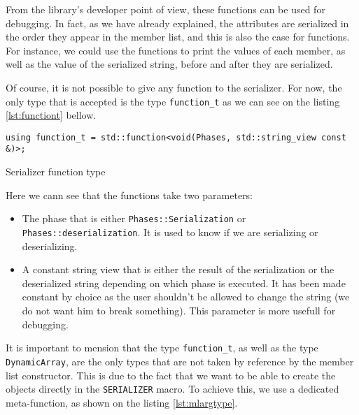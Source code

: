 From the library's developer point of view, these functions can be used for
debugging. In fact, as we have already explained, the attributes are serialized
in the order they appear in the member list, and this is also the case for
functions. For instance, we could use the functions to print the values of each
member, as well as the value of the serialized string, before and after they are
serialized.

Of course, it is not possible to give any function to the serializer. For now,
the only type that is accepted is the type \texttt{function\_t} as we can see on
the listing \ref{lst:functiont} bellow.

\begin{listing}[ht!]
\begin{verbatim}
using function_t = std::function<void(Phases, std::string_view const &)>;
\end{verbatim}
\caption{Serializer function type}
\label{lst:functiont}
\end{listing}

Here we cann see that the functions take two parameters:

\begin{itemize}
  \item The phase that is either \texttt{Phases::Serialization} or
    \texttt{Phases::deserialization}. It is used to know if we are serializing
    or deserializing.
  \item A constant string view that is either the result of the serialization or
    the deserialized string depending on which phase is executed. It has been
    made constant by choice as the user shouldn't be allowed to change the
    string (we do not want him to break something). This parameter is more
    usefull for debugging.
\end{itemize}

It is important to mension that the type \texttt{function\_t}, as well as the
type \texttt{DynamicArray}, are the only types that are not taken by reference
by the member list constructor. This is due to the fact that we want to be able
to create the objects directly in the \texttt{SERIALIZER} macro. To achieve
this, we use a dedicated meta-function, as shown on the listing
\ref{lst:mlargtype}.

